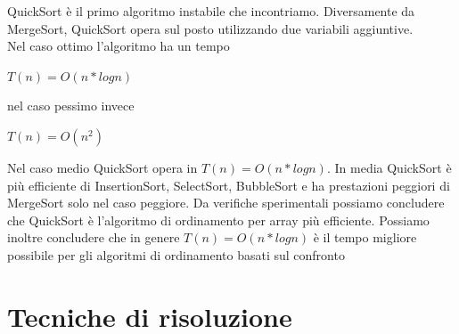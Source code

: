 \documentclass[11pt, oneside]{article}   	%
\begin{document}
\begin{itemize}
\begin{center}
\end{center}
QuickSort è il primo algoritmo instabile che incontriamo. Diversamente da MergeSort, QuickSort opera sul posto utilizzando due variabili aggiuntive. \\Nel caso ottimo l'algoritmo ha un tempo \begin{center} $T(n) = O(n * logn)$ \end{center}nel caso pessimo invece \begin{center} $T(n) = O(n^2)$ \end{center} Nel caso medio QuickSort opera in $T(n) = O(n * logn)$.
In media QuickSort è più efficiente di InsertionSort, SelectSort, BubbleSort e ha prestazioni peggiori di MergeSort solo nel caso peggiore. Da verifiche sperimentali possiamo concludere che QuickSort è l'algoritmo di ordinamento per array più efficiente. Possiamo inoltre concludere che in genere $T(n) = O(n * logn)$ è il tempo migliore possibile per gli algoritmi di ordinamento basati sul confronto
\end{itemize}
\section{Tecniche di risoluzione}
\end{document}
